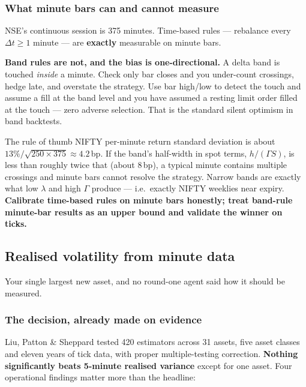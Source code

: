 \documentclass[11pt,a4paper]{article}
\begin{document}
\subsubsection{What minute bars can and cannot measure}

NSE's continuous session is 375 minutes. Time-based rules --- rebalance every
$\Delta t \ge 1$ minute --- are \textbf{exactly} measurable on minute bars.

\textbf{Band rules are not, and the bias is one-directional.} A delta band is
touched \emph{inside} a minute. Check only bar closes and you under-count
crossings, hedge late, and overstate the strategy. Use bar high/low to detect the
touch and assume a fill at the band level and you have assumed a resting limit
order filled at the touch --- zero adverse selection. That is the standard silent
optimism in band backtests.

\begin{keyfact}{The rule of thumb}
NIFTY per-minute return standard deviation is about $13\%/\sqrt{250 \times 375}
\approx 4.2\,$bp. If the band's half-width in spot terms, $h/(\Gamma S)$, is less
than roughly twice that (about 8\,bp), a typical minute contains multiple
crossings and minute bars cannot resolve the strategy. Narrow bands are exactly
what low $\lambda$ and high $\Gamma$ produce --- i.e.\ exactly NIFTY weeklies near
expiry. \textbf{Calibrate time-based rules on minute bars honestly; treat
band-rule minute-bar results as an upper bound and validate the winner on ticks.}
\end{keyfact}

\subsection{Realised volatility from minute data}
\label{sec:rv}

Your single largest new asset, and no round-one agent said how it should be measured.

\subsubsection{The decision, already made on evidence}

Liu, Patton \& Sheppard tested 420 estimators across 31 assets, five asset
classes and eleven years of tick data, with proper multiple-testing correction.
\textbf{Nothing significantly beats 5-minute realised variance} except for one
asset. Four operational findings matter more than the headline:
\end{document}

